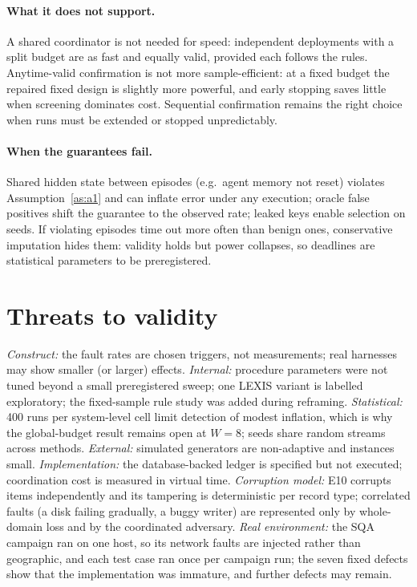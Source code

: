 \documentclass[11pt]{article}
\theoremstyle{definition}
\begin{document}
\paragraph{What it does not support.} A shared coordinator is not needed for speed: independent deployments with a split budget are as fast and equally valid, provided each follows the rules. Anytime-valid confirmation is not more sample-efficient: at a fixed budget the repaired fixed design is slightly more powerful, and early stopping saves little when screening dominates cost. Sequential confirmation remains the right choice when runs must be extended or stopped unpredictably.

\paragraph{When the guarantees fail.} Shared hidden state between episodes (e.g.\ agent memory not reset) violates Assumption~\ref{as:a1} and can inflate error under any execution; oracle false positives shift the guarantee to the observed rate; leaked keys enable selection on seeds. If violating episodes time out more often than benign ones, conservative imputation hides them: validity holds but power collapses, so deadlines are statistical parameters to be preregistered.

\section{Threats to validity}\label{sec:threats}
\textit{Construct:} the fault rates are chosen triggers, not measurements; real harnesses may show smaller (or larger) effects. \textit{Internal:} procedure parameters were not tuned beyond a small preregistered sweep; one LEXIS variant is labelled exploratory; the fixed-sample rule study was added during reframing. \textit{Statistical:} 400 runs per system-level cell limit detection of modest inflation, which is why the global-budget result remains open at $W=8$; seeds share random streams across methods. \textit{External:} simulated generators are non-adaptive and instances small. \textit{Implementation:} the database-backed ledger is specified but not executed; coordination cost is measured in virtual time. \textit{Corruption model:} E10 corrupts items independently and its tampering is deterministic per record type; correlated faults (a disk failing gradually, a buggy writer) are represented only by whole-domain loss and by the coordinated adversary. \textit{Real environment:} the SQA campaign ran on one host, so its network faults are injected rather than geographic, and each test case ran once per campaign run; the seven fixed defects show that the implementation was immature, and further defects may remain.
\end{document}
